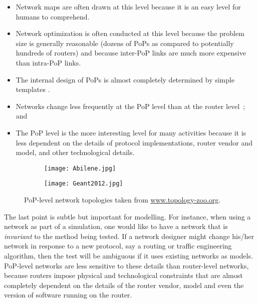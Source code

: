 \begin{itemize}

\item Network maps are often drawn at this level because it is an easy level 
for humans to comprehend.

\item Network optimization is often conducted at this level because the problem 
size is generally reasonable (\eg dozens of PoPs as compared to potentially 
hundreds of routers) and because inter-PoP links are much more expensive than 
intra-PoP links.

\item The internal design of PoPs is almost completely determined by simple 
templates \cite{Cisco05,Gill,Morris07}.

\item Networks change less frequently at the PoP level than at the router 
level~\cite{Shavitt10}; and

\item The PoP level is the more interesting level for many activities because 
it is less dependent on the details of protocol implementations, router vendor 
and model, and other technological details.

\end{itemize}

\begin{figure}[!thbp] 
  \begin{center}
    \begin{subfigure}[b]{0.58\textwidth}
      \centering
      \texttt{[image: Abilene.jpg]}
    \end{subfigure}
    \hspace{0.02\textwidth}
    \begin{subfigure}[b]{0.38\textwidth}
      \centering
    \texttt{[image: Geant2012.jpg]}
    \end{subfigure}
    \caption{PoP-level network topologies taken from \url{www.topology-zoo.org}.
      \label{fig:pop}}
  \end{center}
\end{figure}         

The last point is subtle but important for modelling. For instance, when using a 
network as part of a simulation, one would like to have a network that is 
{\em invariant} to the method being tested. If a network designer might change 
his/her network in response to a new protocol, say a routing or traffic engineering 
algorithm, then the test will be ambiguous if it uses existing networks as models. 
PoP-level networks are less sensitive to these details than router-level networks, 
because routers impose physical and technological constraints that are almost 
completely dependent on the details of the router vendor, model and even the 
version of software running on the router.

